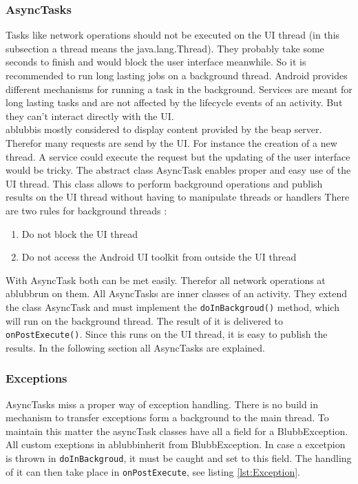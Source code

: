 \documentclass[12pt,a4paper,oneside]{report}
\newcommand{\appname}{ablubb}
\newcommand{\code}[1]{\lstinline{#1}}
\begin{document}
\subsubsection{AsyncTasks}
Tasks like network operations should not be executed on the UI thread (in this subsection a thread means the java.lang.Thread). They probably take some seconds to finish and would block the user interface meanwhile. So it is recommended to run long lasting jobs on a background thread. 
Android provides different mechanisms for running a task in the background.
Services are meant for long lasting tasks and are not affected by the lifecycle events of an activity. But they can't interact directly with the UI. \\
\appname  is mostly considered to display content provided by the beap server. Therefor many requests are send by the UI. For instance the creation of a new thread. A service could execute the request but the updating of the user interface would be tricky. The abstract class AsyncTask enables proper and easy use of the UI thread. This class allows to perform background operations and publish results on the UI thread without having to manipulate threads or handlers\citep{aDefAsyncTask}
There are two rules for background threads
\citep{aDefProcThreads}:
\begin{enumerate}
	\item Do not block the UI thread
	\item Do not access the Android UI toolkit from outside the UI thread
\end{enumerate}
With AsyncTask both can be met easily. Therefor all network operations at \appname  run on them. All AsyncTasks are inner classes of an activity. They extend the class AsyncTask and must implement the \code{doInBackgroud()} method, which will run on the background thread. The result of it is delivered to \code{onPostExecute()}. Since this runs on the UI thread, it is easy to publish the results. In the following section all AsyncTasks are explained.

\subsubsection{Exceptions}
AsyncTasks miss a proper way of exception handling. There is no build in mechanism to transfer exceptions form a background to the main thread. To maintain this matter the asyncTask classes have all a field for a BlubbException. All custom exeptions in \appname  inherit from BlubbException. In case a excetpion is thrown in \code{doInBackgroud}, it must be caught and set to this field. The handling of it can then take place in \code{onPostExecute}, see listing \ref{lst:Exception}.
\end{document}

